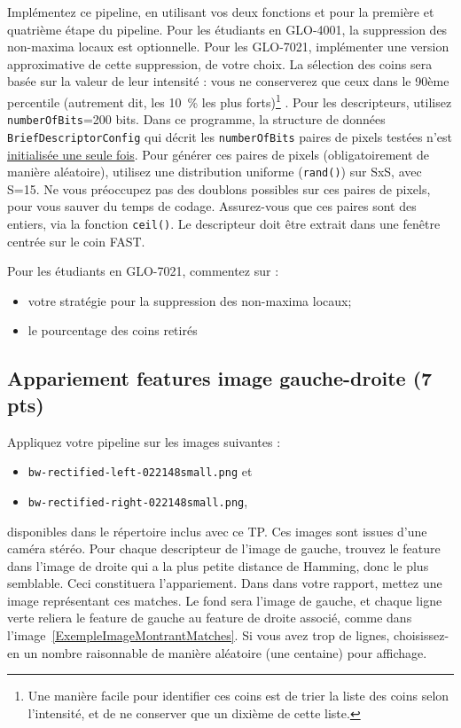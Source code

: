 \documentclass[12pt]{article}
\begin{document}
Implémentez ce pipeline, en utilisant vos deux fonctions  et  pour la première et quatrième étape du pipeline. Pour les étudiants en GLO-4001, la suppression des non-maxima locaux est optionnelle. Pour les GLO-7021, implémenter une version approximative de cette suppression, de votre choix. La sélection des coins sera basée sur la valeur de leur intensité : vous ne conserverez que ceux dans le 90ème percentile (autrement dit, les 10~\% les plus forts)\footnote{Une manière facile pour identifier ces coins est de trier la liste des coins selon l'intensité, et de ne conserver que un dixième de cette liste.} . Pour les descripteurs, utilisez \texttt{numberOfBits}=200 bits. Dans ce programme, la structure de données \texttt{BriefDescriptorConfig} qui décrit les \texttt{numberOfBits} paires de pixels testées n'est \underline{initialisée une seule fois}. Pour générer ces paires de pixels (obligatoirement de manière aléatoire), utilisez une distribution uniforme (\texttt{rand()}) sur SxS, avec S=15. Ne vous préoccupez pas des doublons possibles sur ces paires de pixels, pour vous sauver du temps de codage. Assurez-vous que ces paires sont des entiers, via la fonction \texttt{ceil()}. Le descripteur doit être extrait dans une fenêtre centrée sur le coin FAST.

Pour les étudiants en GLO-7021, commentez sur :
\begin{itemize}
\item votre stratégie pour la suppression des non-maxima locaux;
\item le pourcentage des coins retirés
\end{itemize}

\subsection{Appariement features image gauche-droite (7 pts)}
 Appliquez votre pipeline sur les images suivantes :
 \begin{itemize}
 \item \texttt{bw-rectified-left-022148small.png} et
 \item \texttt{bw-rectified-right-022148small.png}, 
 \end{itemize}
 disponibles dans le répertoire inclus avec ce TP. Ces images sont issues d'une caméra stéréo. Pour chaque descripteur de l'image de gauche, trouvez le feature dans l'image de droite qui a la plus petite distance de Hamming, donc le plus semblable. Ceci constituera l'appariement. Dans dans votre rapport, mettez une image représentant ces matches. Le fond sera l'image de gauche, et chaque ligne verte reliera le feature de gauche au feature de droite associé, comme dans l'image~\ref{ExempleImageMontrantMatches}. Si vous avez trop de lignes, choisissez-en un nombre raisonnable de manière aléatoire (une centaine) pour affichage.
\end{document}
